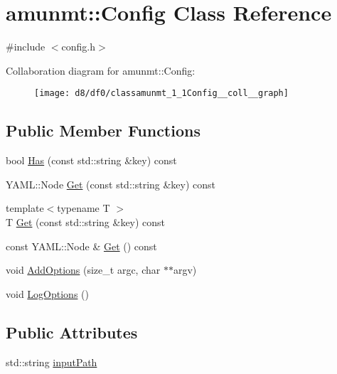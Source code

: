 \hypertarget{classamunmt_1_1Config}{}\section{amunmt\+:\+:Config Class Reference}
\label{classamunmt_1_1Config}


{\ttfamily \#include $<$config.\+h$>$}



Collaboration diagram for amunmt\+:\+:Config\+:
\nopagebreak
\begin{figure}[H]
\begin{center}
\leavevmode
\texttt{[image: d8/df0/classamunmt\_1\_1Config\_\_coll\_\_graph]}
\end{center}
\end{figure}
\subsection*{Public Member Functions}
\begin{DoxyCompactItemize}
\item 
bool \hyperlink{classamunmt_1_1Config_aea1c78c5d37a811d86d8b49b8dac94d1}{Has} (const std\+::string \&key) const 
\item 
Y\+A\+M\+L\+::\+Node \hyperlink{classamunmt_1_1Config_a5257f41272d06c35bebe8130b5897d23}{Get} (const std\+::string \&key) const 
\item 
{\footnotesize template$<$typename T $>$ }\\T \hyperlink{classamunmt_1_1Config_aa7e531efa35245ae0dd6ccbe02e98006}{Get} (const std\+::string \&key) const 
\item 
const Y\+A\+M\+L\+::\+Node \& \hyperlink{classamunmt_1_1Config_a76c3003096368571fd19e3621691e734}{Get} () const 
\item 
void \hyperlink{classamunmt_1_1Config_ae621721651f919b18e8719a6f30ad568}{Add\+Options} (size\+\_\+t argc, char $\ast$$\ast$argv)
\item 
void \hyperlink{classamunmt_1_1Config_ab10da8bb0a4fbc3a41867f9c14e17059}{Log\+Options} ()
\end{DoxyCompactItemize}
\subsection*{Public Attributes}
\begin{DoxyCompactItemize}
\item 
std\+::string \hyperlink{classamunmt_1_1Config_a3e3069f6b6637092d6cfe202f1e57b25}{input\+Path}
\end{DoxyCompactItemize}
